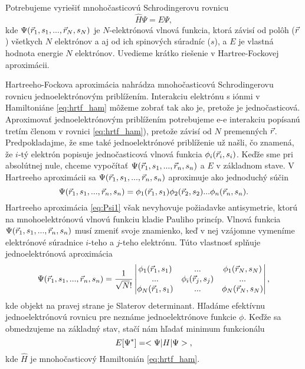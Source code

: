 Potrebujeme vyriešiť mnohočasticovú Schrodingerovu rovnicu
\begin{equation}
\label{eq:mohocasticovaschr}
\hat{H} \Psi = E \Psi,
\end{equation}
kde $\Psi(\vec{r}_1,s_1,...,\vec{r}_N,s_N)$ je $N$-elektrónová vlnová funkcia, ktorá závisí od polôh ($\vec{r}$) všetkych $N$ elektrónov
a aj od ich spinových súradníc ($s$), a $E$ je vlastná hodnota energie $N$ elektrónov. Uvedieme krátko riešenie v Hartree-Fockovej aproximácii.




Hartreeho-Fockova aproximácia nahrádza mnohočasticovú Schrodingerovu rovnicu jednoelektrónovým priblížením.
Interakciu elektrónu s iónmi v Hamiltoniáne \eqref{eq:hrtf_ham} môžeme zobrať tak ako je, pretože je jednočasticová.
Aproximovať jednoelektrónovým priblížením potrebujeme e-e interakciu popísanú tretím členom v rovnici \ref{eq:hrtf_ham}), pretože závisí od $N$ premenných $\vec{r}$.
Predpokladajme, že sme také jednoelektrónové priblíženie už našli, čo znamená, že $i$-tý elektrón popisuje jednočasticová vlnová funkcia
$\phi_i(\vec{r}_i,s_i)$. Keďže sme pri absolútnej nule, chceme vypočítať $\Psi(\vec{r}_1,s_1,...,\vec{r}_n,s_n)$ a $E$  v základnom stave.
V Hartreeho aproximácii sa $\Psi(\vec{r}_1,s_1,...,\vec{r}_n,s_n)$ aproximuje ako jednoduchý súčin
\begin{equation}
\label{eq:Psi1}
\Psi(\vec{r}_1,s_1,...,\vec{r}_n,s_n)=\phi_1(\vec{r}_1,s_1)\phi_2(\vec{r}_2,s_2)...\phi_n(\vec{r}_n,s_n) \text{.}
\end{equation}
Hartreeho aproximácia \eqref{eq:Psi1} však nevyhovuje požiadavke antisymetrie, ktorú na mnohoelektrónovú vlnovú funkciu kladie Pauliho princíp.
Vlnová funkcia $\Psi(\vec{r}_1,s_1,...,\vec{r}_n,s_n)$ musí zmeniť svoje znamienko,
keď v nej vzájomne vymeníme elektrónové súradnice $i$-teho a $j$-teho elektrónu. Túto vlastnosť splňuje jednoelektrónová aproximácia
\begin{equation}
\label{eq:slatter}
\Psi(\vec{r}_1,s_1,...,\vec{r}_n,s_n)=\frac{1}{\sqrt N!}
\begin{vmatrix}
\phi_1(\vec{r}_1,s_1)& ... & \phi_1(\vec{r}_N,s_N) \\
...& \phi_i(\vec{r}_j,s_j)& ... \\
\phi_N(\vec{r}_1,s_1)& ... & \phi_N(\vec{r}_N,s_N)
\end{vmatrix}
\text{,}
\end{equation}
kde objekt na pravej strane je Slaterov determinant. Hľadáme efektívnu jednoelektrónovú rovnicu pre neznáme jednoelektrónove funkcie $\phi$.
Keďže sa obmedzujeme na základný stav,
stačí nám hľadať minimum funkcionálu
\begin{equation}
\label{eq:erg_func}
E[\Psi^*]=<\Psi|H|\Psi>\text{,}
\end{equation}
kde $\hat{H}$ je mnohočasticový Hamiltonián \eqref{eq:hrtf_ham}.

